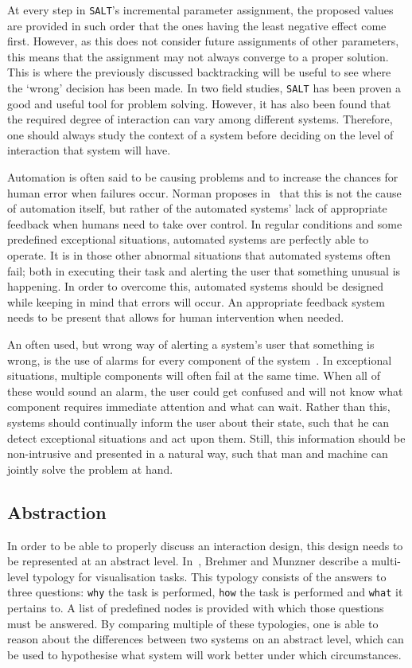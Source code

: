 At every step in \verb|SALT|'s incremental parameter assignment, the proposed values are provided in such order that the ones having the least negative effect come first. However, as this does not consider future assignments of other parameters, this means that the assignment may not always converge to a proper solution. This is where the previously discussed backtracking will be useful to see where the `wrong' decision has been made. In two field studies, \verb|SALT| has been proven a good and useful tool for problem solving. However, it has also been found that the required degree of interaction can vary among different systems. Therefore, one should always study the context of a system before deciding on the level of interaction that system will have.

Automation is often said to be causing problems and to increase the chances for human error when failures occur. Norman proposes in~\cite{norman1990problem} that this is not the cause of automation itself, but rather of the automated systems' lack of appropriate feedback when humans need to take over control. In regular conditions and some predefined exceptional situations, automated systems are perfectly able to operate. It is in those other abnormal situations that automated systems often fail; both in executing their task and alerting the user that something unusual is happening. In order to overcome this, automated systems should be designed while keeping in mind that errors will occur. An appropriate feedback system needs to be present that allows for human intervention when needed.

An often used, but wrong way of alerting a system's user that something is wrong, is the use of alarms for every component of the system~\cite{norman1990problem}. In exceptional situations, multiple components will often fail at the same time. When all of these would sound an alarm, the user could get confused and will not know what component requires immediate attention and what can wait. Rather than this, systems should continually inform the user about their state, such that he can detect exceptional situations and act upon them. Still, this information should be non-intrusive and presented in a natural way, such that man and machine can jointly solve the problem at hand.

\subsection{Abstraction}
In order to be able to properly discuss an interaction design, this design needs to be represented at an abstract level. In~\cite{brehmer2013multi}, Brehmer and Munzner describe a multi-level typology for visualisation tasks. This typology consists of the answers to three questions: \verb|why| the task is performed, \verb|how| the task is performed and \verb|what| it pertains to. A list of predefined nodes is provided with which those questions must be answered. By comparing multiple of these typologies, one is able to reason about the differences between two systems on an abstract level, which can be used to hypothesise what system will work better under which circumstances.


